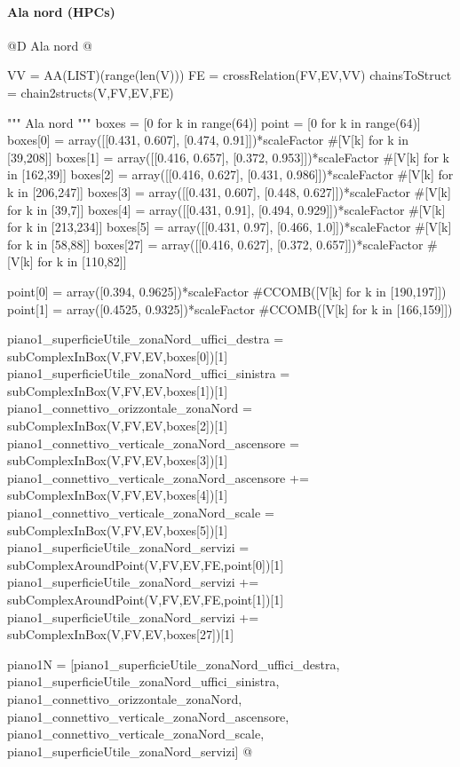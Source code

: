 \documentclass[11pt,oneside]{article}    %
\begin{document}
\paragraph{Ala nord (HPCs)}
@D Ala nord
@{VV = AA(LIST)(range(len(V)))
FE = crossRelation(FV,EV,VV)
chainsToStruct = chain2structs(V,FV,EV,FE)

""" Ala nord """
boxes = [0 for k in range(64)]
point = [0 for k in range(64)]
boxes[0] = array([[0.431, 0.607], [0.474, 0.91]])*scaleFactor #[V[k] for k in [39,208]]
boxes[1] = array([[0.416, 0.657], [0.372, 0.953]])*scaleFactor #[V[k] for k in [162,39]]
boxes[2] = array([[0.416, 0.627], [0.431, 0.986]])*scaleFactor #[V[k] for k in [206,247]]
boxes[3] = array([[0.431, 0.607], [0.448, 0.627]])*scaleFactor #[V[k] for k in [39,7]]
boxes[4] = array([[0.431, 0.91], [0.494, 0.929]])*scaleFactor  #[V[k] for k in [213,234]]
boxes[5] = array([[0.431, 0.97], [0.466, 1.0]])*scaleFactor #[V[k] for k in [58,88]]
boxes[27] = array([[0.416, 0.627], [0.372, 0.657]])*scaleFactor #[V[k] for k in [110,82]]

point[0] = array([0.394, 0.9625])*scaleFactor #CCOMB([V[k] for k in [190,197]])
point[1] = array([0.4525, 0.9325])*scaleFactor #CCOMB([V[k] for k in [166,159]])

piano1_superficieUtile_zonaNord_uffici_destra = subComplexInBox(V,FV,EV,boxes[0])[1]
piano1_superficieUtile_zonaNord_uffici_sinistra = subComplexInBox(V,FV,EV,boxes[1])[1]
piano1_connettivo_orizzontale_zonaNord = subComplexInBox(V,FV,EV,boxes[2])[1]
piano1_connettivo_verticale_zonaNord_ascensore = subComplexInBox(V,FV,EV,boxes[3])[1]
piano1_connettivo_verticale_zonaNord_ascensore += subComplexInBox(V,FV,EV,boxes[4])[1]
piano1_connettivo_verticale_zonaNord_scale = subComplexInBox(V,FV,EV,boxes[5])[1]
piano1_superficieUtile_zonaNord_servizi = subComplexAroundPoint(V,FV,EV,FE,point[0])[1]
piano1_superficieUtile_zonaNord_servizi += subComplexAroundPoint(V,FV,EV,FE,point[1])[1]
piano1_superficieUtile_zonaNord_servizi += subComplexInBox(V,FV,EV,boxes[27])[1]

piano1N = [piano1_superficieUtile_zonaNord_uffici_destra, piano1_superficieUtile_zonaNord_uffici_sinistra, piano1_connettivo_orizzontale_zonaNord, piano1_connettivo_verticale_zonaNord_ascensore, piano1_connettivo_verticale_zonaNord_scale, piano1_superficieUtile_zonaNord_servizi]
@}
\end{document}
